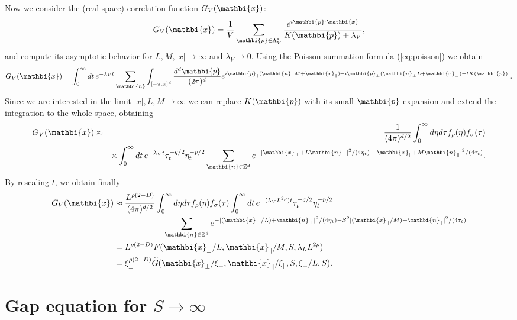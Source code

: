 \documentclass[a4paper,12pt]{article}
\newcommand{\pos}[1]{\mathbi{#1}}
\begin{document}
{Now we consider the (real-space) correlation
function $G_V(\pos{x})$:
\begin{equation}
   \label{eq:FSScorrfunc1}
   G_V(\pos{x}) = \frac{1}{V}\sum_{\pos{p} \in \Lambda^*_V}
   \frac{e^{i \pos{p}\cdot \pos{x}}}{K(\pos{p})+\lambda_V},
\end{equation}
and compute its asymptotic behavior for $L,M,|x|\to\infty$ and 
$\lambda_V\to0$.
Using the Poisson summation formula (\ref{eq:poisson}) we obtain
\begin{equation}
G_V(\pos{x})  =
  \int_0^\infty dt\, e^{-\lambda_V t}  \sum_{\pos{n}}
  \int_{[-\pi,\pi]^d} \frac{d^d\pos{p}}{(2\pi)^d}
   e^{i \pos{p}_\| (\pos{n}_\| M+\pos{x}_\|)+
      i \pos{p}_\bot (\pos{n}_\bot L+\pos{x}_\bot)
      - t K(\pos{p})}\; .
\end{equation}
Since we are interested in the limit $|x|,L,M\to\infty$
we can replace $K(\pos{p})$
with its small-$\pos{p}$ expansion and extend the integration to the 
whole space, obtaining
\begin{eqnarray}
G_V(\pos{x})
  &\approx& \frac{1}{(4\pi)^{d/2}}
   \int_0^\infty d\eta d\tau f_\rho(\eta) f_\sigma(\tau)
\nonumber \\
  && \times
   \int_0^\infty dt\, e^{-\lambda_V t}
   \tau_t^{-q/2} \eta_t^{-p/2} \sum_{\pos{n} \in \mathbb{Z}^d} 
e^{-|\pos{x}_\bot+L
   \pos{n}_\bot|^2/(4 \eta_t) - |\pos{x}_\|+M \pos{n}_\||^2/(4 \tau_t)}.
\end{eqnarray}
By rescaling $t$, we obtain finally
\begin{equation}
\begin{split}
G_V(\pos{x}) & \approx
   \frac{L^{\rho(2-D)}}{(4\pi)^{d/2}}
   \int_0^\infty d\eta d\tau f_\rho(\eta) f_\sigma(\tau)
   \int_0^\infty dt\, e^{-(\lambda_V L^{2\rho}) t} \tau_t^{-q/2} 
\eta_t^{-p/2}
\\
& \qquad \qquad \qquad
    \sum_{\pos{n} \in \mathbb{Z}^d} e^{-|(\pos{x}_\bot/L)+
   \pos{n}_\bot|^2/(4 \eta_t) - S^2 |(\pos{x}_\|/M)+ \pos{n}_\||^2/(4 
\tau_t)}
\\ & = L^{\rho(2-D)} F(\pos{x}_\bot/L, \pos{x}_\|/M, S, \lambda_L 
L^{2\rho})
\\ & = \xi_\bot^{\rho(2-D)}
   \widetilde G (\pos{x}_\bot/\xi_\bot, \pos{x}_\|/\xi_\|, S, 
\xi_\bot/L,S).
\end{split}
\label{eq:oinfty-fss-corrfunc}
\end{equation}


\section{Gap equation for $S\rightarrow\infty$} \label{AppC}

}
\end{document}
